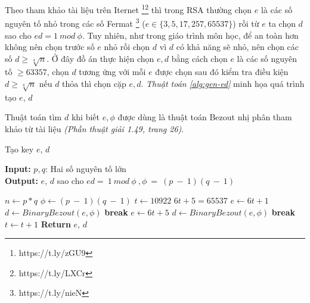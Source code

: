 Theo tham khảo tài liệu trên Iternet \footnote{https://t.ly/zGU9}\footnote{https://t.ly/LXCr} thì trong RSA thường chọn $e$ là các số nguyên tố nhỏ trong các số Fermat 
\footnote{https://t.ly/nieN} ($e \in \{3,5,17,257,65537\}$) 
rồi từ $e$ ta chọn $d$ sao cho $ed = 1\ mod\ \phi$.
Tuy nhiên, như trong giáo trình môn học, để an toàn hơn không nên chọn trước số $e$ nhỏ rồi chọn $d$ vì $d$ có khả năng sẽ nhỏ, nên chọn các số $d \geq \sqrt[4]{n}$.
\cleardoublepage
Ở đây đồ án thực hiện chọn $e, d$ bằng cách chọn $e$ là các số nguyên tố $\geq 63357$, chọn $d$ tương ứng với mỗi $e$ được chọn sau đó kiểm tra điều kiện $d \geq \sqrt[4]{n}$ 
nếu $d$ thỏa thì chọn cặp $e, d$. \textit{Thuật toán \ref{alg:gen-ed}} minh họa quá trình tạo $e$, $d$

Thuật toán tìm $d$ khi biết $e, \phi$ được dùng là thuật toán Bezout nhị phân tham khảo từ tài liệu \cite{giaotrinh} \textit{(Phần thuật giải 1.49, trang 26)}.

\begin{algorithm}[H]
\caption{Tạo key $e$, $d$}\label{alg:gen-ed}
\hspace*{\algorithmicindent} \textbf{Input:} $p, q$: Hai số nguyên tố lớn\\
\hspace*{\algorithmicindent} \textbf{Output:} $e$, $d$ sao cho $ed = \ 1\ mod\ \phi\ ,\phi\ =\ (p\ -\ 1)(q\ -\ 1)$ 
\begin{algorithmic}[1]
\State $n \gets p*q$
\State $\phi \gets (p\ -\ 1)(q\ -\ 1)$
\State $t \gets 10922$ \Comment $6t + 5 = 65537$
\State $e \gets 6t + 1$
\State $d \gets BinaryBezout(e, \phi)$
\State \textbf{break}
\EndIf
\EndIf
\State $e \gets 6t+5$
\State $d \gets BinaryBezout(e, \phi)$
\State \textbf{break}
\EndIf
\EndIf
\State $t \gets t + 1$
\EndWhile
\State \textbf{Return } $e$, $d$
\EndProcedure
\end{algorithmic}
\end{algorithm}
